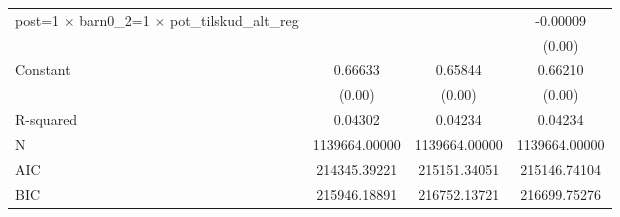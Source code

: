 \begin{table}[htbp]
\begin{tabular}{l*{3}{c}}
post=1 $\times$ barn0\_2=1 $\times$ pot\_tilskud\_alt\_reg&                     &                     &    -0.00009\sym{***}\\
                    &                     &                     &      (0.00)         \\
Constant            &     0.66633\sym{***}&     0.65844\sym{***}&     0.66210\sym{***}\\
                    &      (0.00)         &      (0.00)         &      (0.00)         \\
\hline
R-squared           &     0.04302         &     0.04234         &     0.04234         \\
N                   &1139664.00000         &1139664.00000         &1139664.00000         \\
AIC                 &214345.39221         &215151.34051         &215146.74104         \\
BIC                 &215946.18891         &216752.13721         &216699.75276         \\
\hline\hline
\end{tabular}
\end{table}
